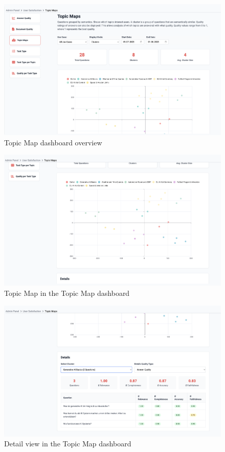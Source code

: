 \documentclass[
	english,
	ruledheaders=section,%
	class=report,%
	thesis={type=bachelor},%
	accentcolor=1b,%
	custommargins=true,%
	marginpar=false,%
	parskip=half-,%
	fontsize=11pt,%
	DIV=14,
]{tudapub}
\begin{document}
\begin{figure}[h!]
    \centering
    \includegraphics[width=0.75\linewidth]{images/TopicMapsOverview.png}
    \captionsetup{list=no}
    \caption{Topic Map dashboard overview}
    \label{fig:topic_maps_overview}
\end{figure}

\begin{figure}[h!]
    \centering
    \includegraphics[width=0.75\linewidth]{images/TopicMapsMap.png}
    \captionsetup{list=no}
    \caption{Topic Map in the Topic Map dashboard}
    \label{fig:topic_maps_maps}
\end{figure}

\begin{figure}[h!]
    \centering
    \includegraphics[width=0.75\linewidth]{images/TopicMapsDetails.png}
    \captionsetup{list=no}
    \caption{Detail view in the Topic Map dashboard}
    \label{fig:topic_maps_details}
\end{figure}
\end{document}
